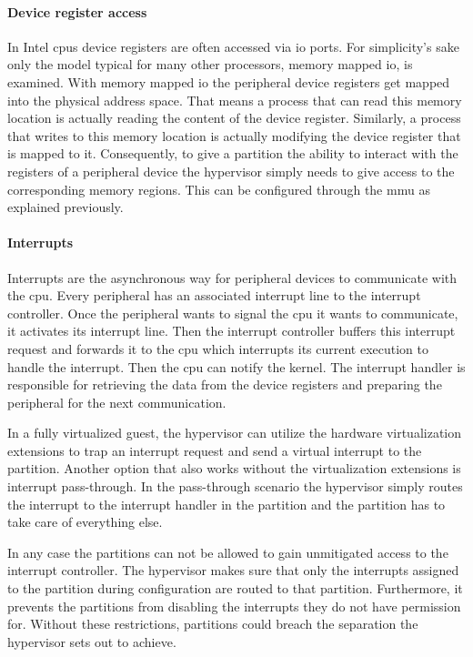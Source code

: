 \paragraph{Device register access}
In Intel \acrshort{cpu}s device registers are often accessed via \acrshort{io} ports. For simplicity's sake only the model typical for many other processors, memory mapped \acrshort{io}, is examined. With memory mapped \acrshort{io} the peripheral device registers get mapped into the physical address space. That means a process that can read this memory location is actually reading the content of the device register. Similarly, a process that writes to this memory location is actually modifying the device register that is mapped to it. Consequently, to give a partition the ability to interact with the registers of a peripheral device the hypervisor simply needs to give access to the corresponding memory regions. This can be configured through the \acrshort{mmu} as explained previously.

\paragraph{Interrupts}
Interrupts are the asynchronous way for peripheral devices to communicate with the \acrshort{cpu}. Every peripheral has an associated interrupt line to the interrupt controller. Once the peripheral wants to signal the \acrshort{cpu} it wants to communicate, it activates its interrupt line. Then the interrupt controller buffers this interrupt request and forwards it to the \acrshort{cpu} which interrupts its current execution to handle the interrupt. Then the \acrshort{cpu} can notify the kernel. The interrupt handler is responsible for retrieving the data from the device registers and preparing the peripheral for the next communication.

In a fully virtualized guest, the hypervisor can utilize the hardware virtualization extensions to trap an interrupt request and send a virtual interrupt to the partition. Another option that also works without the virtualization extensions is interrupt pass-through. In the pass-through scenario the hypervisor simply routes the interrupt to the interrupt handler in the partition and the partition has to take care of everything else.

In any case the partitions can not be allowed to gain unmitigated access to the interrupt controller. The hypervisor makes sure that only the interrupts assigned to the partition during configuration are routed to that partition. Furthermore, it prevents the partitions from disabling the interrupts they do not have permission for. Without these restrictions, partitions could breach the separation the hypervisor sets out to achieve.

